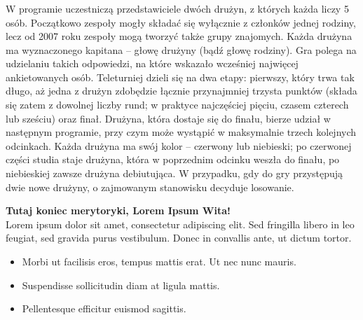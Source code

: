 \documentclass{beamer}
\begin{document}
\begin{frame}

\frametitle{}
\small{W programie uczestniczą przedstawiciele dwóch drużyn, z których każda liczy 5 osób. Początkowo zespoły mogły składać się 
wyłącznie z członków jednej rodziny, lecz od 2007 roku zespoły mogą tworzyć także grupy znajomych. Każda drużyna ma wyznaczonego 
kapitana – głowę drużyny (bądź głowę rodziny). Gra polega na udzielaniu takich odpowiedzi, na które wskazało wcześniej najwięcej 
ankietowanych osób. Teleturniej dzieli się na dwa etapy: pierwszy, który trwa tak długo, aż jedna z drużyn zdobędzie łącznie 
przynajmniej trzysta punktów (składa się zatem z dowolnej liczby rund; w praktyce najczęściej pięciu, czasem czterech lub sześciu) oraz 
finał. Drużyna, która dostaje się do finału, bierze udział w następnym programie, przy czym może wystąpić w maksymalnie trzech kolejnych 
odcinkach. Każda drużyna ma swój kolor – czerwony lub niebieski; po czerwonej części studia staje drużyna, która w poprzednim odcinku 
weszła do finału, po niebieskiej zawsze drużyna debiutująca. W przypadku, gdy do gry przystępują dwie nowe drużyny, o zajmowanym 
stanowisku decyduje losowanie.}

\end{frame}
\begin{frame}


\end{frame}
\begin{frame}

\large{\textbf{Tutaj koniec merytoryki, Lorem Ipsum Wita!}}\\
Lorem ipsum dolor sit amet, consectetur adipiscing elit. Sed fringilla libero in leo feugiat, sed gravida purus vestibulum. Donec in 
convallis ante, ut dictum tortor.
\begin{itemize}
    \item Morbi ut facilisis eros, tempus mattis erat. Ut nec nunc mauris.
    \item Suspendisse sollicitudin diam at ligula mattis.
    \item Pellentesque efficitur euismod sagittis.
\end{itemize}
\end{frame}
\end{document}

